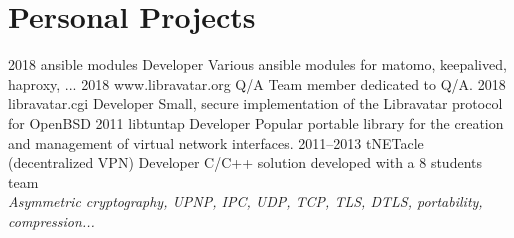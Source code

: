 \documentclass[]{friggeri-cv} %
\begin{document}

\section{Personal Projects}
\begin{entrylist}
\entry
{2018}
{ansible modules}
{Developer}
{Various ansible modules for matomo, keepalived, haproxy, ...}
\entry
{2018}
{www.libravatar.org}
{Q/A}
{Team member dedicated to Q/A.}
\entry
{2018}
{libravatar.cgi}
{Developer}
{Small, secure implementation of the Libravatar protocol for OpenBSD}
\entry
{2011}
{libtuntap}
{Developer}
{Popular portable library for the creation and management of virtual network interfaces.}
\entry
{2011--2013}
{tNETacle (decentralized VPN)}
{Developer}
{C/C++ solution developed with a 8 students team \\
\emph{Asymmetric cryptography, UPNP, IPC, UDP, TCP, TLS, DTLS, portability, compression...}}
\end{entrylist}
\end{document}
